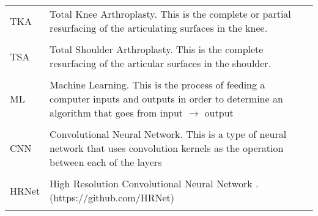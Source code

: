 \singlespacing
\begin{tabular}{l p{5in}} 
TKA & Total Knee Arthroplasty. This is the complete or partial resurfacing of the articulating surfaces in the knee.\\
  \\
  TSA & Total Shoulder Arthroplasty. This is the complete resurfacing of the articular surfaces in the shoulder. \\
\\
ML & Machine Learning. This is the process of feeding a computer inputs and outputs in order to determine an algorithm that goes from input $\longrightarrow$ output\\
\\
CNN & Convolutional Neural Network. This is a type of neural network that uses convolution kernels as the operation between each of the layers\\
\\
HRNet & High Resolution Convolutional Neural Network \cite{wangDeepHighResolutionRepresentation2020}. (https://github.com/HRNet)\\
\\
\end{tabular}

\doublespacing

